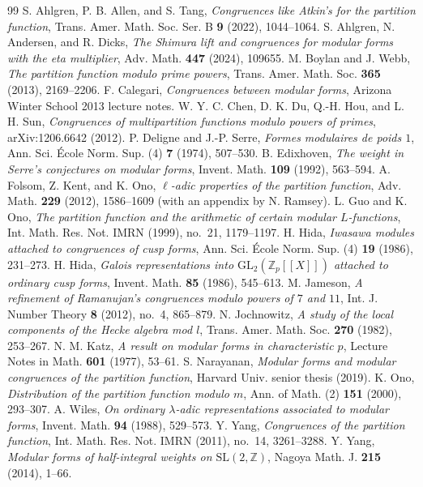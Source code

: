 \documentclass[11pt,reqno]{amsart}
\theoremstyle{definition}
\theoremstyle{remark}
\newcommand{\Z}{\mathbb{Z}}
\newcommand{\SL}{\mathrm{SL}}
\begin{document}
\begin{thebibliography}{99}
 S. Ahlgren, P. B. Allen, and S. Tang, \emph{Congruences like Atkin's for the partition function}, Trans. Amer. Math. Soc. Ser. B \textbf{9} (2022), 1044--1064.
 S. Ahlgren, N. Andersen, and R. Dicks, \emph{The Shimura lift and congruences for modular forms with the eta multiplier}, Adv. Math. \textbf{447} (2024), 109655.
 M. Boylan and J. Webb, \emph{The partition function modulo prime powers}, Trans. Amer. Math. Soc. \textbf{365} (2013), 2169--2206.
 F. Calegari, \emph{Congruences between modular forms}, Arizona Winter School 2013 lecture notes.
 W. Y. C. Chen, D. K. Du, Q.-H. Hou, and L. H. Sun, \emph{Congruences of multipartition functions modulo powers of primes}, arXiv:1206.6642 (2012).
 P. Deligne and J.-P. Serre, \emph{Formes modulaires de poids $1$}, Ann. Sci. \'Ecole Norm. Sup. (4) \textbf{7} (1974), 507--530.
 B. Edixhoven, \emph{The weight in Serre's conjectures on modular forms}, Invent. Math. \textbf{109} (1992), 563--594.
 A. Folsom, Z. Kent, and K. Ono, \emph{$\ell$-adic properties of the partition function}, Adv. Math. \textbf{229} (2012), 1586--1609 (with an appendix by N. Ramsey).
 L. Guo and K. Ono, \emph{The partition function and the arithmetic of certain modular $L$-functions}, Int. Math. Res. Not. IMRN (1999), no.~21, 1179--1197.
 H. Hida, \emph{Iwasawa modules attached to congruences of cusp forms}, Ann. Sci. \'Ecole Norm. Sup. (4) \textbf{19} (1986), 231--273.
 H. Hida, \emph{Galois representations into $\mathrm{GL}_2(\Z_p[[X]])$ attached to ordinary cusp forms}, Invent. Math. \textbf{85} (1986), 545--613.
 M. Jameson, \emph{A refinement of Ramanujan's congruences modulo powers of $7$ and $11$}, Int. J. Number Theory \textbf{8} (2012), no.~4, 865--879.
 N. Jochnowitz, \emph{A study of the local components of the Hecke algebra mod $l$}, Trans. Amer. Math. Soc. \textbf{270} (1982), 253--267.
 N. M. Katz, \emph{A result on modular forms in characteristic $p$}, Lecture Notes in Math. \textbf{601} (1977), 53--61.
 S. Narayanan, \emph{Modular forms and modular congruences of the partition function}, Harvard Univ. senior thesis (2019).
 K. Ono, \emph{Distribution of the partition function modulo $m$}, Ann. of Math. (2) \textbf{151} (2000), 293--307.
 A. Wiles, \emph{On ordinary $\lambda$-adic representations associated to modular forms}, Invent. Math. \textbf{94} (1988), 529--573.
 Y. Yang, \emph{Congruences of the partition function}, Int. Math. Res. Not. IMRN (2011), no.~14, 3261--3288.
 Y. Yang, \emph{Modular forms of half-integral weights on $\SL(2,\Z)$}, Nagoya Math. J. \textbf{215} (2014), 1--66.
\end{thebibliography}
\end{document}
